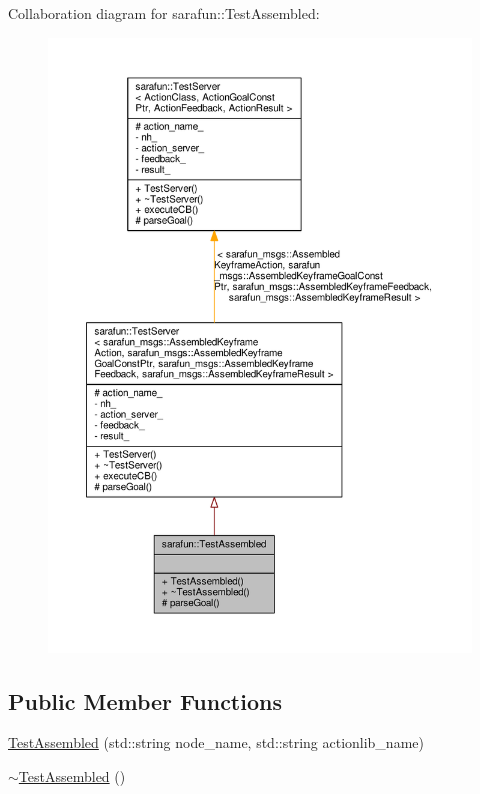 Collaboration diagram for sarafun\-:\-:Test\-Assembled\-:
\nopagebreak
\begin{figure}[H]
\begin{center}
\leavevmode
\includegraphics[width=350pt]{d8/d24/classsarafun_1_1TestAssembled__coll__graph}
\end{center}
\end{figure}
\subsection*{Public Member Functions}
\begin{DoxyCompactItemize}
\item 
\hyperlink{classsarafun_1_1TestAssembled_a8dc24147e3bf80fc15270d83b1f49c89_a8dc24147e3bf80fc15270d83b1f49c89}{Test\-Assembled} (std\-::string node\-\_\-name, std\-::string actionlib\-\_\-name)
\item 
\hyperlink{classsarafun_1_1TestAssembled_a5f9109b205eea68a6f54773657198880_a5f9109b205eea68a6f54773657198880}{$\sim$\-Test\-Assembled} ()
\end{DoxyCompactItemize}
